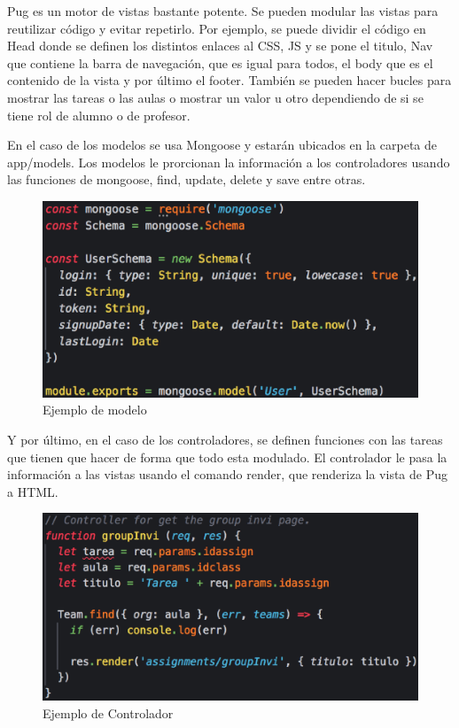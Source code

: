 Pug es un motor de vistas bastante potente. Se pueden modular las vistas para reutilizar código y evitar repetirlo.
Por ejemplo, se puede dividir el código en Head donde se definen los distintos enlaces al CSS, JS y se pone el titulo, 
Nav que contiene la barra de navegación, que es igual para todos, el body que es el contenido de la vista y por último el footer.
También se pueden hacer bucles para mostrar las tareas o las aulas o mostrar un valor u otro dependiendo de si se tiene rol de alumno o de profesor.

\newpage

En el caso de los modelos se usa Mongoose y estarán ubicados en la carpeta de app/models. Los modelos le prorcionan la información a los controladores usando las funciones de mongoose, find, update, delete y save entre otras.

\begin{figure}[!th]
\begin{center}
\includegraphics[scale=0.5]{images/modelo}
\caption{Ejemplo de modelo}
\label{fig:Ejemplo de modelo}
\end{center}
\end{figure}

Y por último, en el caso de los controladores, se definen funciones con las tareas que tienen que hacer
de forma que todo esta modulado. El controlador le pasa la información a las vistas usando el comando render, que renderiza la vista de Pug a HTML.


\begin{figure}[!th]
\begin{center}
\includegraphics[scale=0.5]{images/controlador}
\caption{Ejemplo de Controlador}
\label{fig:Ejemplo de Controlador}
\end{center}
\end{figure}

